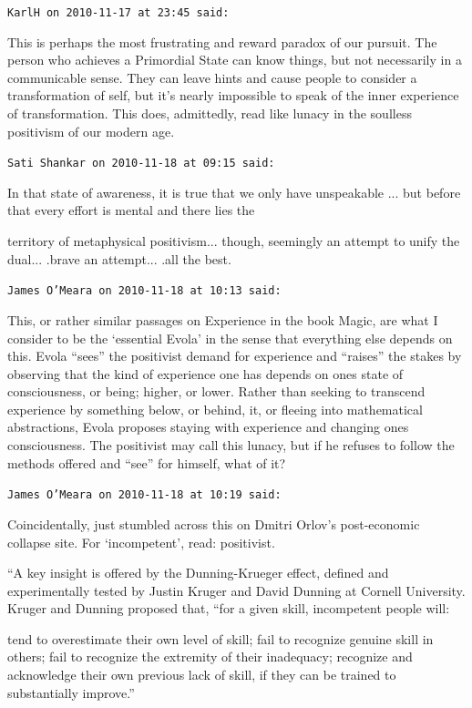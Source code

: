 \begin{footnotesize}
\begin{sffamily}
\texttt{KarlH on 2010-11-17 at 23:45 said:}

This is perhaps the most frustrating and reward paradox of our pursuit. The person who achieves a Primordial State can know things, but not necessarily in a communicable sense. They can leave hints and cause people to consider a transformation of self, but it's nearly impossible to speak of the inner experience of transformation. This does, admittedly, read like lunacy in the soulless positivism of our modern age.

\hfill

\texttt{Sati Shankar on 2010-11-18 at 09:15 said:}

In that state of awareness, it is true that we only have unspeakable
... but before that every effort is mental and there lies the

territory of metaphysical positivism... though, seemingly an attempt to unify the dual... .brave an attempt... .all the best.

\hfill

\texttt{James O'Meara on 2010-11-18 at 10:13 said:}

This, or rather similar passages on Experience in the book Magic, are what I consider to be the `essential Evola' in the sense that everything else depends on this. Evola ``sees'' the positivist demand for experience and ``raises'' the stakes by observing that the kind of experience one has depends on ones state of consciousness, or being; higher, or lower. Rather than seeking to transcend experience by something below, or behind, it, or fleeing into mathematical abstractions, Evola proposes staying with experience and changing ones consciousness. The positivist may call this lunacy, but if he refuses to follow the methods offered and ``see'' for himself, what of it?

\hfill

\texttt{James O'Meara on 2010-11-18 at 10:19 said:}

Coincidentally, just stumbled across this on Dmitri Orlov's post-economic collapse site. For `incompetent', read: positivist.

``A key insight is offered by the Dunning-Krueger effect, defined and experimentally tested by Justin Kruger and David Dunning at Cornell University. Kruger and Dunning proposed that, ``for a given skill, incompetent people will:

tend to overestimate their own level of skill;
fail to recognize genuine skill in others;
fail to recognize the extremity of their inadequacy;
recognize and acknowledge their own previous lack of skill, if they can be trained to substantially improve.''


\end{sffamily}
\end{footnotesize}
